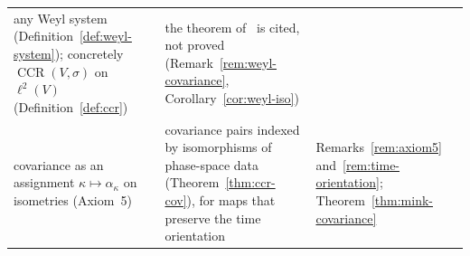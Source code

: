 \documentclass[11pt]{article}
\numberwithin{equation}{section}
\newif\ifdimockedition
\newcommand{\extraonly}[1]{\ifdimockedition\else#1\fi}
\theoremstyle{definition}
\theoremstyle{remark}
\theoremstyle{plain}
\newcommand{\CCR}{\operatorname{CCR}}
\newcommand{\revs}[1]{#1}  %
\begin{document}
{\begin{longtable}{@{}>{\raggedright\arraybackslash}p{}>{\raggedright\arraybackslash}p{}>{\raggedright\arraybackslash}p{}@{}}
\revs{any Weyl system (Definition~\ref{def:weyl-system}); concretely $\CCR(V,\sigma)$ on
$\ell^2(V)$ (Definition~\ref{def:ccr})} &
\revs{the theorem of~\cite{slawny} is cited, not proved (Remark~\ref{rem:weyl-covariance},
Corollary~\ref{cor:weyl-iso})} \\\addlinespace[3pt]
\revs{covariance as an assignment $\kappa\mapsto\alpha_\kappa$ on isometries (Axiom~5)} &
\revs{covariance pairs indexed by isomorphisms of phase-space data (Theorem~\ref{thm:ccr-cov}), for
maps that preserve the time orientation} &
\revs{Remarks~\ref{rem:axiom5} and~\ref{rem:time-orientation}; Theorem~\ref{thm:mink-covariance}} \\
\bottomrule
\end{longtable}}
\addtocounter{table}{-1}%



\extraonly{}

\extraonly{}






\ifdimockedition\else\fi
\end{document}
